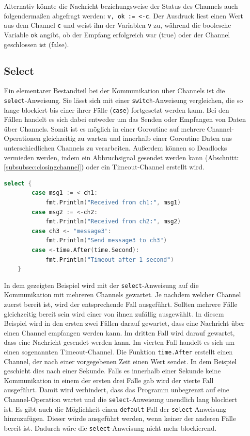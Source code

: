 \documentclass[fontsize=12pt,paper=a4,twoside=semi,parskip=half-,headsepline,headinclude]{scrreprt}
\begin{document}
Alternativ könnte die Nachricht beziehungsweise der Status des Channels auch folgendermaßen abgefragt werden: \texttt{v, ok := <-c}. Der Ausdruck liest einen Wert aus dem Channel \texttt{c} und weist ihn der Variablen \texttt{v} zu, während die boolesche Variable \texttt{ok} angibt, ob der Empfang erfolgreich war (true) oder der Channel geschlossen ist (false).

\subsection{Select}

Ein elementarer Bestandteil bei der Kommunikation über Channels ist die \texttt{select}-An\-wei\-sung\cite{GoSpecification2024}. Sie lässt sich mit einer \texttt{switch}-Anweisung vergleichen, die so lange blockiert bis einer ihrer Fälle (\texttt{case}) fortgesetzt werden kann. Bei den Fällen handelt es sich dabei entweder um das Senden oder Empfangen von Daten über Channels. Somit ist es möglich in einer Goroutine auf mehrere Channel-Operationen gleichzeitig zu warten und innerhalb einer Goroutine Daten aus unterschiedlichen Channels zu verarbeiten. Außerdem können so Deadlocks vermieden werden, indem ein Abbruchsignal gesendet werden kann (Abschnitt: \ref{subsubsec:closingchannel}) oder ein Timeout-Channel erstellt wird.

\begin{lstlisting}[language=Go,extendedchars=true]
	select {
		case msg1 := <-ch1:
			fmt.Println("Received from ch1:", msg1)
		case msg2 := <-ch2:
			fmt.Println("Received from ch2:", msg2)
		case ch3 <- "message3":
			fmt.Println("Send message3 to ch3")
		case <-time.After(time.Second):
			fmt.Println("Timeout after 1 second")
	}
\end{lstlisting}

In dem gezeigten Beispiel wird mit der \texttt{select}-Anweisung auf die Kommunikation mit mehreren Channels gewartet. Je nachdem welcher Channel zuerst bereit ist, wird der entsprechende Fall ausgeführt. Sollten mehrere Fälle gleichzeitig bereit sein wird einer von ihnen zufällig ausgewählt. In diesem Beispiel wird in den ersten zwei Fällen darauf gewartet, dass eine Nachricht über einen Channel empfangen werden kann. Im dritten Fall wird darauf gewartet, dass eine Nachricht gesendet werden kann. Im vierten Fall handelt es sich um einen sogenannten Timeout-Channel. Die Funktion \texttt{time.After} erstellt einen Channel, der nach einer vorgegebenen Zeit einen Wert sendet. In dem Beispiel geschieht dies nach einer Sekunde. Falls es innerhalb einer Sekunde keine Kommunikation in einem der ersten drei Fälle gab wird der vierte Fall ausgeführt. Damit wird verhindert, dass das Programm unbegrenzt auf eine Channel-Operation wartet und die \texttt{select}-Anweisung unendlich lang blockiert ist. Es gibt auch die Möglichkeit einen \texttt{default}-Fall der \texttt{select}-Anweisung hinzuzufügen. Dieser würde ausgeführt werden, wenn keiner der anderen Fälle bereit ist. Dadurch wäre die \texttt{select}-Anweisung nicht mehr blockierend.
\end{document}
